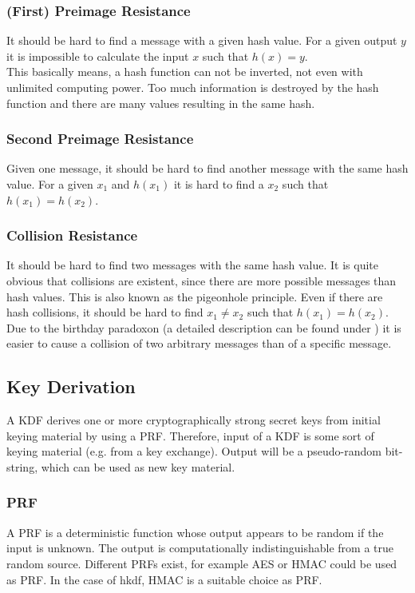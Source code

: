 \subsubsection{(First) Preimage Resistance}
\label{sec:first-pre-resist}
It should be hard to find a message with a given hash value.
For a given output $y$ it is impossible to calculate the input $x$ such that $ h(x) = y$.
\\ This basically means, a hash function can not be inverted, not even with unlimited computing power.
Too much information is destroyed by the hash function and there are many values resulting in the same hash.

\subsubsection{Second Preimage Resistance}
\label{sec:second-pre-resist}
Given one message, it should be hard to find another message with the same hash value.
For a given $x_1$ and $h(x_1)$ it is hard to find a $x_2$ such that $h(x_1) = h(x_2)$.

\subsubsection{Collision Resistance}
\label{sec:col-resist}
It should be hard to find two messages with the same hash value.
It is quite obvious that collisions are existent, since there are more possible messages than hash values.
This is also known as the pigeonhole principle.
Even if there are hash collisions, it should be hard to find $x_1 \ne x_2$ such that $h(x_1) = h(x_2)$.
Due to the birthday paradoxon (a detailed description can be found under \cite{enwiki:1019272750}) it is easier to cause a collision of two arbitrary messages than of a specific message.

\subsection{Key Derivation}
\label{sec:kdf}
A \ac{KDF} derives one or more cryptographically strong secret keys from initial keying material by using a \acl{PRF}.
Therefore, input of a \ac{KDF} is some sort of keying material (e.g. from a key exchange).
Output will be a pseudo-random bit-string, which can be used as new key material.


\subsubsection{\acl{PRF}}
A \ac{PRF} is a deterministic function whose output appears to be random if the input is unknown.
The output is computationally indistinguishable from a true random source.
Different PRFs exist, for example \ac{AES} or HMAC could be used as \ac{PRF}.
In the case of \gls{hkdf}, HMAC is a suitable choice as \ac{PRF}.

